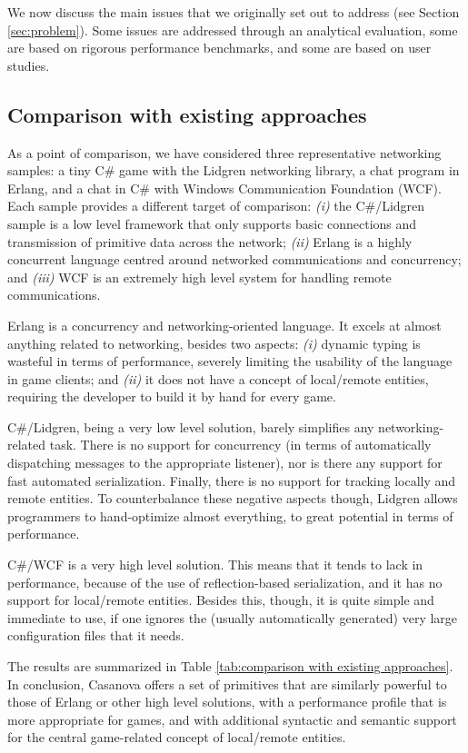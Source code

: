 We now discuss the main issues that we originally set out to address (see Section \ref{sec:problem}). Some issues are addressed through an analytical evaluation, some are based on rigorous performance benchmarks, and some are based on user studies.

\subsection{Comparison with existing approaches}
As a point of comparison, we have considered three representative networking samples: a tiny C\# game with the Lidgren networking library, a chat program in Erlang, and a chat in C\# with Windows Communication Foundation (WCF). Each sample provides a different target of comparison: \textit{(i)} the C\#/Lidgren sample is a low level framework that only supports basic connections and transmission of primitive data across the network; \textit{(ii)} Erlang is a highly concurrent language centred around networked communications and concurrency; and \textit{(iii)} WCF is an extremely high level system for handling remote communications.

Erlang is a concurrency and networking-oriented language. It excels at almost anything related to networking, besides two aspects: \textit{(i)} dynamic typing is wasteful in terms of performance, severely limiting the usability of the language in game clients; and \textit{(ii)} it does not have a concept of local/remote entities, requiring the developer to build it by hand for every game.

C\#/Lidgren, being a very low level solution, barely simplifies any networking-related task. There is no support for concurrency (in terms of automatically dispatching messages to the appropriate listener), nor is there any support for fast automated serialization. Finally, there is no support for tracking locally and remote entities. To counterbalance these negative aspects though, Lidgren allows programmers to hand-optimize almost everything, to great potential in terms of performance.

C\#/WCF is a very high level solution. This means that it tends to lack in performance, because of the use of reflection-based serialization, and it has no support for local/remote entities. Besides this, though, it is quite simple and immediate to use, if one ignores the (usually automatically generated) very large configuration files that it needs.

The results are summarized in Table \ref{tab:comparison with existing approaches}. In conclusion, Casanova offers a set of primitives that are similarly powerful to those of Erlang or other high level solutions, with a performance profile that is more appropriate for games, and with additional syntactic and semantic support for the central game-related concept of local/remote entities.

